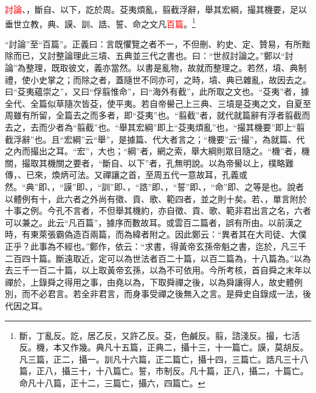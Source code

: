 \textcolor{red}{討論}、，斷自、以下，訖於周。芟夷煩亂，翦截浮辭，舉其宏綱，撮其機要，足以垂世立教，典、謨、訓、誥、誓、命之文凡\textcolor{red}{百篇}。\footnote{斷，丁亂反。訖，居乙反，又許乙反。芟，色鹹反。翦，諮淺反。撮，七活反。機，本又作幾。典凡十五篇，正典二，攝十三，十一篇亡。謨，莫胡反。凡三篇，正二，攝一。訓凡十六篇，正二篇亡，攝十四，三篇亡。誥凡三十八篇，正八，攝三十，十八篇亡。誓，市制反。凡十篇，正八，攝二，十篇亡。命凡十八篇，正十二，三篇亡，攝六，四篇亡。}

{\noindent\shu{}\fzkt “討論”至“百篇”。正義曰：言既懼覽之者不一，不但刪、約史、定、贊易，有所黜除而已，又討整論理此三墳、五典並三代之書也。曰：“世叔討論之。”鄭以“討論”為整理，既取彼文，義亦當然。以書是亂物，故就而整理之。若然，墳、典制禮，使小史掌之；而除之者，蓋隨世不同亦可，之時，墳、典已雜亂，故因去之。曰“芟夷蘊崇之”，又曰“俘翦惟命”，曰“海外有截”，此所取之文也。“芟夷”者，據全代、全篇似草隨次皆芟，使平夷。若自帝嚳己上三典、三墳是芟夷之文，自夏至周雖有所留，全篇去之而多者，即“芟夷”也。“翦截”者，就代就篇辭有浮者翦截而去之，去而少者為“翦截”也。“舉其宏綱”即上“芟夷煩亂”也，“撮其機要”即上“翦截浮辭”也。且“宏綱”云“舉”，是據篇、代大者言之；“機要”云“撮”，為就篇、代之內而撮出之耳。“宏”，大也；“綱”者，網之索，舉大綱則眾目隨之。“機”者，機關，撮取其機關之要者，“斷自、以下”者，孔無明說。以為帝嚳以上，樸略難傳，、已來，煥炳可法。又禪讓之首，至周五代一意故耳，孔義或然。“典”即、，“謨”即、，“訓”即、，“誥”即、，“誓”即、，“命”即、之等是也。說者以體例有十，此六者之外尚有徵、貢、歌、範四者，並之則十矣。若、，單言附於十事之例。今孔不言者，不但舉其機約，亦自徵、貢、歌、範非君出言之名，六者可以兼之。此云“凡百篇”，據序而數故耳。或雲百二篇者，誤有所由。以前漢之時，有東萊張霸偽造百兩篇，而為緯者附之。因此鄭云：“異者其在大司徒、大僕正乎？此事為不經也。”鄭作，依云：“求書，得黃帝玄孫帝魁之書，迄於，凡三千二百四十篇。斷遠取近，定可以為世法者百二十篇，以百二篇為，十八篇為。”以為去三千一百二十篇，以上取黃帝玄孫，以為不可依用。今所考核，首自舜之末年以禪於，上錄舜之得用之事，由堯以為，下取舜禪之後，以為舜讓得人，故史體例別，而不必君言。若全非君言，而身事受禪之後無入之言。是舜史自錄成一法，後代因之耳。 \par}

